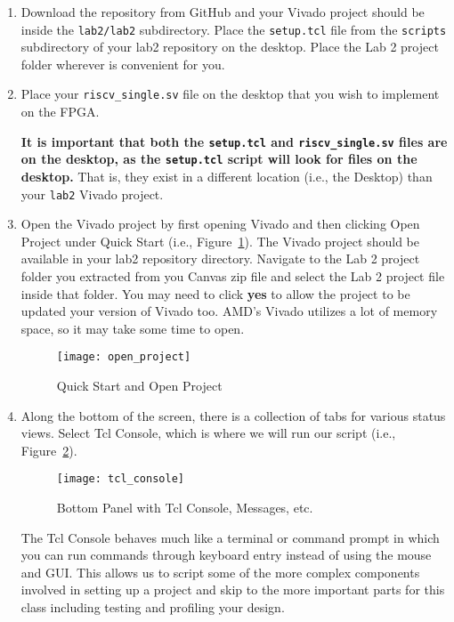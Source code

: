 \documentclass{article}
\begin{document}
\begin{enumerate}
\item Download the repository from GitHub and your Vivado project
  should be inside the \verb|lab2/lab2| subdirectory.  Place the
  \verb|setup.tcl| file from the \verb!scripts! subdirectory of your lab2 repository
  on the desktop.  Place the Lab 2 project folder wherever
is convenient for you.

\item Place your \verb|riscv_single.sv| file on the desktop that you
  wish to implement on the FPGA.  

\textbf{It is important that both the \texttt{setup.tcl} and
\texttt{riscv\_single.sv} files are on the desktop, as the \texttt{setup.tcl}
script will look for files on the desktop.}  That is, they exist in a
different location (i.e., the Desktop) than your \verb!lab2! Vivado project.

\item Open the Vivado project by first opening Vivado and then clicking Open
  Project under Quick Start (i.e., Figure~\ref{fig:openproject}).
  The Vivado project should be available in your lab2 repository directory.
  Navigate to the Lab 2 project folder
  you extracted from you Canvas zip file and select the Lab 2 project file inside
that folder.  You may need to click \textbf{yes} to allow the project
to be updated your version of Vivado too.  AMD's Vivado utilizes a lot
of memory space, so it may take some time to open.
\begin{figure}[h!]
  \centering
  \texttt{[image: open\_project]}
  \caption{Quick Start and Open Project}
  \label{fig:openproject}
\end{figure}

\item Along the bottom of the screen, there is a collection of tabs for various
status views.  Select Tcl Console, which is where we will run our
script (i.e., Figure~\ref{fig:tclconsole}).
\begin{figure}[h!]
  \centering
  \texttt{[image: tcl\_console]}
  \caption{Bottom Panel with Tcl Console, Messages, etc.}
  \label{fig:tclconsole}
\end{figure}

The Tcl Console behaves much like a terminal or command prompt in which you can
run commands through keyboard entry instead of using the mouse and GUI.  This
allows us to script some of the more complex components involved in setting up
a project and skip to the more important parts for this class including testing
and profiling your design.


\end{enumerate}
\end{document}
